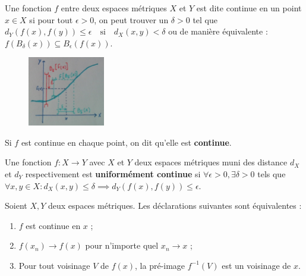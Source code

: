 \begin{definition}

    Une fonction $f$ entre deux espaces métriques $X$ et $Y$ est dite continue en un point $x\in X$ si pour tout $\epsilon>0$, on peut trouver un $\delta>0$ tel que $d_Y(f(x),f(y)) \leq \epsilon \quad\mathrm{si}\quad d_X(x,y)<\delta$ ou de manière équivalente : $f(B_\delta(x)) \subseteq B_\epsilon(f(x))$.\\
    \begin{figure}[H]
        \centering
        \includegraphics[width=0.3\textwidth]{synthese_continuite.jpg}
    \end{figure}
    Si $f$ est continue en chaque point, on dit qu'elle est \textbf{continue}.
\end{definition}

\begin{definition}
    Une fonction $f:X \rightarrow Y$ avec $X$ et $Y$ deux espaces métriques muni des distance $d_X$ et $d_Y$ respectivement est \textbf{uniformément continue} si $\forall \epsilon>0, \exists \delta>0$ tels que $\forall x,y \in X : d_X(x,y) \leq \delta \implies d_Y(f(x),f(y))\leq \epsilon$.
\end{definition}

\begin{theo}
    Soient $X,Y$ deux espaces métriques. Les déclarations suivantes sont équivalentes :
    \begin{enumerate}[label=(\roman*)]
        \item $f$ est continue en $x$ ;
        \item $f(x_n)\rightarrow f(x)$ pour n'importe quel $x_n \rightarrow x$ ;
        \item Pour tout voisinage $V$ de $f(x)$, la pré-image $f^{-1}(V)$ est un voisinage de $x$.
    \end{enumerate}
\end{theo}

